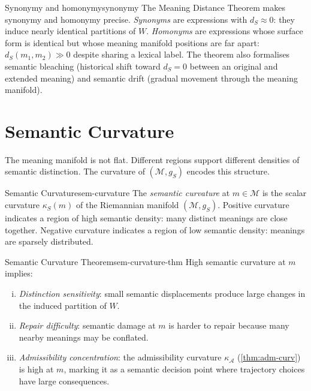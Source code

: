 \documentclass[12pt,twoside,openright]{book}
\newcommand{\adm}{\mathcal{A}}
\begin{document}
\begin{remark}{Synonymy and homonymy}{synonymy}
  The Meaning Distance Theorem makes synonymy and
  homonymy precise.
  \emph{Synonyms} are expressions with $d_S \approx 0$:
  they induce nearly identical partitions of $W$.
  \emph{Homonyms} are expressions whose surface form
  is identical but whose meaning manifold positions are
  far apart: $d_S(m_1, m_2) \gg 0$ despite sharing
  a lexical label.
  The theorem also formalises semantic bleaching
  (historical shift toward $d_S = 0$ between an original
  and extended meaning) and semantic drift
  (gradual movement through the meaning manifold).
\end{remark}

\section{Semantic Curvature}

The meaning manifold is not flat. Different regions
support different densities of semantic distinction.
The curvature of $(\mathcal{M}, g_S)$ encodes this
structure.

\begin{definition}{Semantic Curvature}{sem-curvature}
  The \emph{semantic curvature} at $m \in \mathcal{M}$
  is the scalar curvature $\kappa_S(m)$ of the
  Riemannian manifold $(\mathcal{M}, g_S)$.
  Positive curvature indicates a region of high
  semantic density: many distinct meanings are close
  together.
  Negative curvature indicates a region of low semantic
  density: meanings are sparsely distributed.
\end{definition}

\begin{theorem}{Semantic Curvature Theorem}{sem-curvature-thm}
  High semantic curvature at $m$ implies:
  \begin{enumerate}[(i)]
    \item \emph{Distinction sensitivity}: small
          semantic displacements produce large changes
          in the induced partition of $W$.
    \item \emph{Repair difficulty}: semantic damage
          at $m$ is harder to repair because many
          nearby meanings may be conflated.
    \item \emph{Admissibility concentration}: the
          admissibility curvature $\kappa_\adm$
          (\cref{thm:adm-curv}) is high at $m$,
          marking it as a semantic decision point
          where trajectory choices have large
          consequences.
  \end{enumerate}
\end{theorem}
\end{document}
